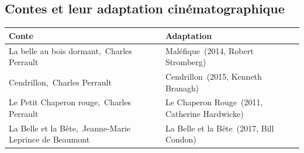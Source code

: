 \documentclass[
  10pt,
  french,
  a5paper,
  openany]{book}
\begin{document}
\hypertarget{contes-et-leur-adaptation-cinuxe9matographique}{%
\subsection*{Contes et leur adaptation cinématographique}\label{contes-et-leur-adaptation-cinuxe9matographique}}

\begin{longtable}[]{@{}ll@{}}
\toprule
\begin{minipage}[b]{0.51\columnwidth}\raggedright
Conte\strut
\end{minipage} & \begin{minipage}[b]{0.43\columnwidth}\raggedright
Adaptation\strut
\end{minipage}\tabularnewline
\midrule
\endhead
\begin{minipage}[t]{0.51\columnwidth}\raggedright
La belle au bois dormant,\linebreak~Charles Perrault\strut
\end{minipage} & \begin{minipage}[t]{0.43\columnwidth}\raggedright
Maléfique\linebreak~(2014, Robert Stromberg)\strut
\end{minipage}\tabularnewline
\begin{minipage}[t]{0.51\columnwidth}\raggedright
Cendrillon,\linebreak~Charles Perrault\strut
\end{minipage} & \begin{minipage}[t]{0.43\columnwidth}\raggedright
Cendrillon\linebreak~(2015, Kenneth Branagh)\strut
\end{minipage}\tabularnewline
\begin{minipage}[t]{0.51\columnwidth}\raggedright
Le Petit Chaperon rouge,\linebreak~Charles Perrault\strut
\end{minipage} & \begin{minipage}[t]{0.43\columnwidth}\raggedright
Le Chaperon Rouge\linebreak~(2011, Catherine Hardwicke)\strut
\end{minipage}\tabularnewline
\begin{minipage}[t]{0.51\columnwidth}\raggedright
La Belle et la Bête,\linebreak~Jeanne-Marie Leprince de Beaumont\strut
\end{minipage} & \begin{minipage}[t]{0.43\columnwidth}\raggedright
La Belle et la Bête\linebreak~(2017, Bill Condon)\strut
\end{minipage}\tabularnewline
\bottomrule
\end{longtable}
\end{document}
